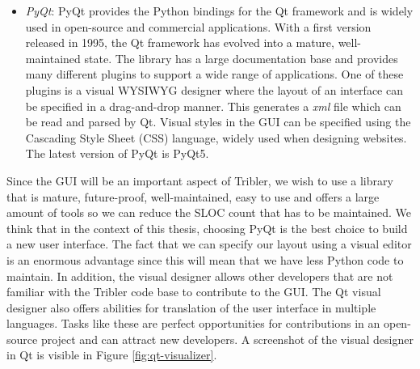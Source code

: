 \begin{itemize}
	\item \emph{PyQt}\cite{summerfield2007rapid}: PyQt provides the Python bindings for the Qt framework and is widely used in open-source and commercial applications. With a first version released in 1995, the Qt framework has evolved into a mature, well-maintained state. The library has a large documentation base and provides many different plugins to support a wide range of applications. One of these plugins is a visual WYSIWYG designer where the layout of an interface can be specified in a drag-and-drop manner. This generates a \emph{xml} file which can be read and parsed by Qt. Visual styles in the GUI can be specified using the Cascading Style Sheet (CSS) language, widely used when designing websites. The latest version of PyQt is PyQt5.
\end{itemize}
Since the GUI will be an important aspect of Tribler, we wish to use a library that is mature, future-proof, well-maintained, easy to use and offers a large amount of tools so we can reduce the SLOC count that has to be maintained. We think that in the context of this thesis, choosing PyQt is the best choice to build a new user interface. The fact that we can specify our layout using a visual editor is an enormous advantage since this will mean that we have less Python code to maintain. In addition, the visual designer allows other developers that are not familiar with the Tribler code base to contribute to the GUI. The Qt visual designer also offers abilities for translation of the user interface in multiple languages. Tasks like these are perfect opportunities for contributions in an open-source project and can attract new developers. A screenshot of the visual designer in Qt is visible in Figure \ref{fig:qt-visualizer}.

